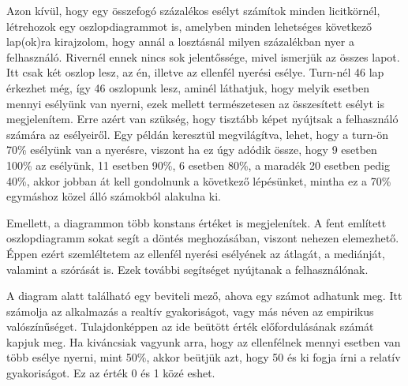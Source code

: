 Azon kívül, hogy egy összefogó százalékos esélyt számítok minden licitkörnél, létrehozok egy oszlopdiagrammot is, amelyben minden lehetséges következő lap(ok)ra kirajzolom, hogy annál a losztásnál milyen százalékban nyer a felhasználó. Rivernél ennek nincs sok jelentőssége, mivel ismerjük az összes lapot. Itt csak két oszlop lesz, az én, illetve az ellenfél nyerési esélye. Turn-nél 46 lap érkezhet még, így 46 oszlopunk lesz, aminél láthatjuk, hogy melyik esetben mennyi esélyünk van nyerni, ezek mellett természetesen az összesített esélyt is megjelenítem. Erre azért van szükség, hogy tisztább képet nyújtsak a felhasználó számára az esélyeiről. Egy példán keresztül megvilágítva, lehet, hogy a turn-ön 70\% esélyünk van a nyerésre, viszont ha ez úgy adódik össze, hogy 9 esetben 100\% az esélyünk, 11 esetben 90\%, 6 esetben 80\%, a maradék 20 esetben pedig 40\%, akkor jobban át kell gondolnunk a következő lépésünket, mintha ez a 70\% egymáshoz közel álló számokból alakulna ki.

Emellett, a diagrammon több konstans értéket is megjelenítek. A fent említett oszlopdiagramm sokat segít a döntés meghozásában, viszont nehezen elemezhető. Éppen ezért szemléltetem az ellenfél nyerési esélyének az átlagát, a mediánját, valamint a szórását is. Ezek további segítséget nyújtanak a felhasználónak.

A diagram alatt található egy beviteli mező, ahova egy számot adhatunk meg. Itt számolja az alkalmazás a realtív gyakoriságot, vagy más néven az empirikus valószínűséget. Tulajdonképpen az ide beütött érték előfordulásának számát kapjuk meg. Ha kiváncsiak vagyunk arra, hogy az ellenfélnek mennyi esetben van több esélye nyerni, mint 50\%, akkor beütjük azt, hogy 50 és ki fogja írni a relatív gyakoriságot. Ez az érték 0 és 1 közé eshet.